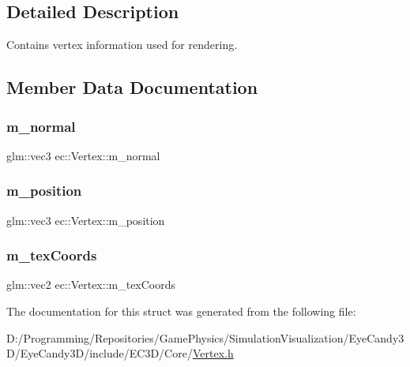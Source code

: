 \subsection{Detailed Description}
Contains vertex information used for rendering. 

\subsection{Member Data Documentation}
\mbox{\label{structec_1_1_vertex_aec5eb9b7fc72c250525c6b64bfabd2a2}} 
\subsubsection{\texorpdfstring{m\+\_\+normal}{m\_normal}}
{\footnotesize\ttfamily glm\+::vec3 ec\+::\+Vertex\+::m\+\_\+normal}

\mbox{\label{structec_1_1_vertex_acb3327c996406e4d1a6b43cfa1f3ea47}} 
\subsubsection{\texorpdfstring{m\+\_\+position}{m\_position}}
{\footnotesize\ttfamily glm\+::vec3 ec\+::\+Vertex\+::m\+\_\+position}

\mbox{\label{structec_1_1_vertex_a12e2b45d0fdb3873a01dd9ada9e66f64}} 
\subsubsection{\texorpdfstring{m\+\_\+tex\+Coords}{m\_texCoords}}
{\footnotesize\ttfamily glm\+::vec2 ec\+::\+Vertex\+::m\+\_\+tex\+Coords}



The documentation for this struct was generated from the following file\+:\begin{DoxyCompactItemize}
\item 
D\+:/\+Programming/\+Repositories/\+Game\+Physics/\+Simulation\+Visualization/\+Eye\+Candy3\+D/\+Eye\+Candy3\+D/include/\+E\+C3\+D/\+Core/\mbox{\hyperlink{_vertex_8h}{Vertex.\+h}}\end{DoxyCompactItemize}
